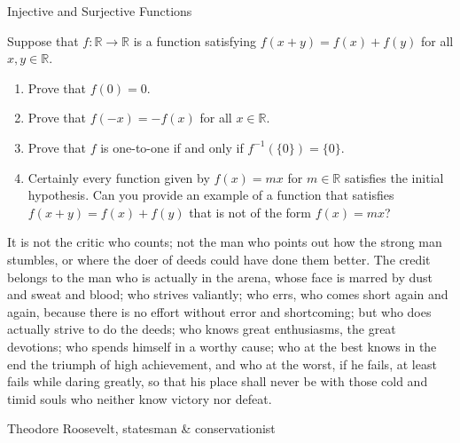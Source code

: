 \begin{section}{Injective and Surjective Functions}
\begin{problem}
Suppose that $f: \mathbb{R}\to \mathbb{R}$ is a function satisfying $f(x+y)=f(x)+f(y)$ for all $x,y\in\mathbb{R}$.
\begin{enumerate}[label=\textrm{(\alph*)}]
\item Prove that $f(0)=0$.
\item Prove that $f(-x)=-f(x)$ for all $x\in\mathbb{R}$.
\item Prove that $f$ is one-to-one if and only if $f^{-1}(\{0\})=\{0\}$.
\item Certainly every function given by $f(x)=mx$ for $m\in\mathbb{R}$ satisfies the initial hypothesis. Can you provide an example of a function that satisfies $f(x+y)=f(x)+f(y)$ that is not of the form $f(x)=mx$?
\end{enumerate}
\end{problem}

\begingroup
\setlength{\epigraphwidth}{0.8\textwidth}
\epigraph{It is not the critic who counts; not the man who points out how the strong man stumbles, or where the doer of deeds could have done them better. The credit belongs to the man who is actually in the arena, whose face is marred by dust and sweat and blood; who strives valiantly; who errs, who comes short again and again, because there is no effort without error and shortcoming; but who does actually strive to do the deeds; who knows great enthusiasms, the great devotions; who spends himself in a worthy cause; who at the best knows in the end the triumph of high achievement, and who at the worst, if he fails, at least fails while daring greatly, so that his place shall never be with those cold and timid souls who neither know victory nor defeat.}{Theodore Roosevelt, statesman \& conservationist}
\endgroup

\end{section}